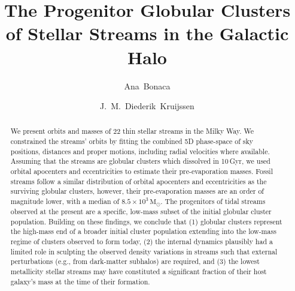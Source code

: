 \documentclass[twocolumn]{aastex63}
\newcommand{\msun}{\ensuremath{\textrm{M}_\odot}}
\begin{document}
\sloppy\sloppypar\raggedbottom\frenchspacing %

\title{The Progenitor Globular Clusters of Stellar Streams in the Galactic Halo}


\author[0000-0002-7846-9787]{Ana~Bonaca}

\author[0000-0002-8804-0212]{J.~M.~Diederik~Kruijssen}


\begin{abstract}\noindent %
We present orbits and masses of 22 thin stellar streams in the Milky Way.
We constrained the streams' orbits by fitting the combined 5D phase-space of sky positions, distances and proper motions, including radial velocities where available.
Assuming that the streams are globular clusters which dissolved in 10\,Gyr, we used orbital apocenters and eccentricities to estimate their pre-evaporation masses.
Fossil streams follow a similar distribution of orbital apocenters and eccentricities as the surviving globular clusters, however, their pre-evaporation masses are an order of magnitude lower, with a median of $8.5\times10^3\,\msun$.
The progenitors of tidal streams observed at the present are a specific, low-mass subset of the initial globular cluster population.
Building on these findings, we conclude that (1) globular clusters represent the high-mass end of a broader initial cluster population extending into the low-mass regime of clusters observed to form today,
(2) the internal dynamics plausibly had a limited role in sculpting the observed density variations in streams such that external perturbations (e.g., from dark-matter subhalos) are required, and
(3) the lowest metallicity stellar streams may have constituted a significant fraction of their host galaxy's mass at the time of their formation.
\end{abstract}
\end{document}
